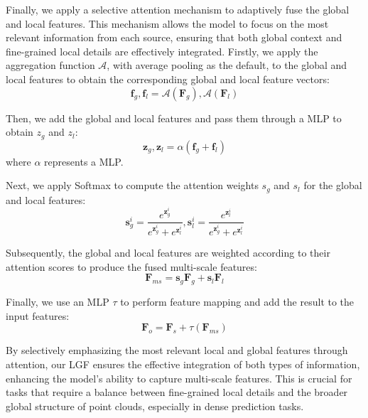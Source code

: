 Finally, we apply a selective attention mechanism to adaptively fuse the global and local features. This mechanism allows the model to focus on the most relevant information from each source, ensuring that both global context and fine-grained local details are effectively integrated. Firstly, we apply the aggregation function $\mathcal{A}$, with average pooling as the default, to the global and local features to obtain the corresponding global and local feature vectors:
\begin{equation}
    \boldsymbol{f}_g, \boldsymbol{f}_l = \mathcal{A}(\boldsymbol{F}_g),  \mathcal{A}(\boldsymbol{F}_l)
\end{equation}

Then, we add the global and local features and pass them through a MLP to obtain $z_g$ and $z_l$:
\begin{equation}
    \boldsymbol{z}_g, \boldsymbol{z}_l = \alpha \left( \boldsymbol{f}_g + \boldsymbol{f}_l \right)
\end{equation}
where $\alpha$ represents a MLP.

Next, we apply Softmax to compute the attention weights $s_g$ and $s_l$ for the global and local features:
\begin{equation}
    \boldsymbol{s}_g^i = \frac{e^{\boldsymbol{z}_g^i}}{e^{\boldsymbol{z}_g^i} + e^{\boldsymbol{z}_l^i}}, \boldsymbol{s}_l^i = \frac{e^{\boldsymbol{z}_l^i}}{e^{\boldsymbol{z}_g^i} + e^{\boldsymbol{z}_l^i}}
\end{equation}

Subsequently, the global and local features are weighted according to their attention scores to produce the fused multi-scale features:
\begin{equation}
    \boldsymbol{F}_{ms} = \boldsymbol{s}_g \boldsymbol{F}_g + \boldsymbol{s}_l \boldsymbol{F}_l
\end{equation}

Finally, we use an MLP $\tau$ to perform feature mapping and add the result to the input features:
\begin{equation}
     \boldsymbol{F}_{o} = \boldsymbol{F}_s + \tau \left( \boldsymbol{F}_{ms} \right)
\end{equation}

By selectively emphasizing the most relevant local and global features through attention, our LGF ensures the effective integration of both types of information, enhancing the model's ability to capture multi-scale features. This is crucial for tasks that require a balance between fine-grained local details and the broader global structure of point clouds, especially in dense prediction tasks.

